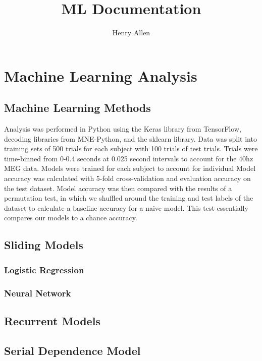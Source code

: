 \documentclass[12pt]{article}
\title{ML Documentation}
\author{Henry Allen}
\begin{document}
\maketitle
\section{Machine Learning Analysis}
\subsection{Machine Learning Methods}
Analysis was performed in Python using the Keras library from TensorFlow, decoding libraries
from MNE-Python, and the sklearn library. Data was split into training sets of 500 trials for
each subject with 100 trials of test trials. Trials were time-binned from 0-0.4 seconds at 0.025
second intervals to account for the 40hz MEG data. Models were trained for each subject to account
for individual Model accuracy was calculated with 5-fold cross-validation and evaluation accuracy
on the test dataset. Model accuracy was then compared with the results of a permutation test, in
which we shuffled around the training and test labels of the dataset to calculate a baseline accuracy
for a naive model. This test essentially compares our models to a chance accuracy. 

\subsection{Sliding Models}
\subsubsection{Logistic Regression}

\subsubsection{Neural Network}

\subsection{Recurrent Models}

\subsection{Serial Dependence Model}
    
\end{document}
